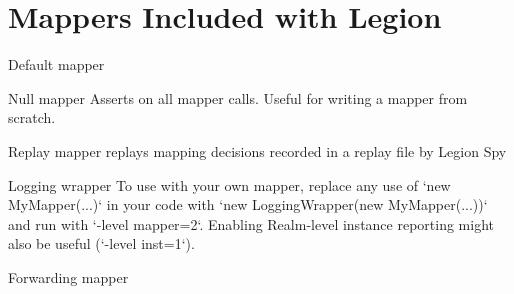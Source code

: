 


\section{Mappers Included with Legion}

Default mapper

Null mapper
Asserts on all mapper calls. Useful for writing a mapper from scratch.

Replay mapper
replays mapping decisions recorded in a replay file by Legion Spy

Logging wrapper
 To use with your own mapper, replace any use of `new MyMapper(...)` in your
 code with `new LoggingWrapper(new MyMapper(...))` and run with
 `-level mapper=2`. Enabling Realm-level instance reporting might also be
 useful (`-level inst=1`).

Forwarding mapper

